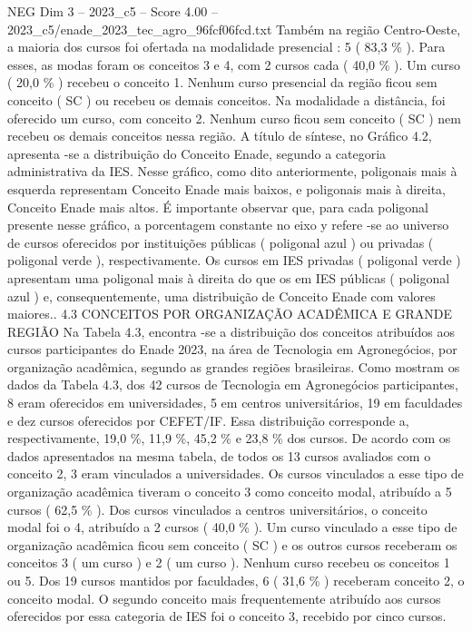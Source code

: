 \begin{textsample}{NEG Dim 3 – 2023\_c5 – Score 4.00 – 2023\_c5/enade\_2023\_tec\_agro\_96fcf06fcd.txt}
Também na região Centro-Oeste, a maioria dos cursos foi ofertada na modalidade presencial : 5 ( 83,3 \% ).
Para esses, as modas foram os conceitos 3 e 4, com 2 cursos cada ( 40,0 \% ).
Um curso ( 20,0 \% ) recebeu o conceito 1.
Nenhum curso presencial da região ficou sem conceito ( SC ) ou recebeu os demais conceitos.
Na modalidade a distância, foi oferecido um curso, com conceito 2.
Nenhum curso ficou sem conceito ( SC ) nem recebeu os demais conceitos nessa região.
A título de síntese, no Gráfico 4.2, apresenta -se a distribuição do Conceito Enade, segundo a categoria administrativa da IES.
Nesse gráfico, como dito anteriormente, poligonais mais à esquerda representam Conceito Enade mais baixos, e poligonais mais à direita, Conceito Enade mais altos.
É importante observar que, para cada poligonal presente nesse gráfico, a porcentagem constante no eixo y refere -se ao universo de cursos oferecidos por instituições públicas ( poligonal azul ) ou privadas ( poligonal verde ), respectivamente.
Os cursos em IES privadas ( poligonal verde ) apresentam uma poligonal mais à direita do que os em IES públicas ( poligonal azul ) e, consequentemente, uma distribuição de Conceito Enade com valores maiores.. 4.3 CONCEITOS POR ORGANIZAÇÃO ACADÊMICA E GRANDE REGIÃO Na Tabela 4.3, encontra -se a distribuição dos conceitos atribuídos aos cursos participantes do Enade 2023, na área de Tecnologia em Agronegócios, por organização acadêmica, segundo as grandes regiões brasileiras.
Como mostram os dados da Tabela 4.3, dos 42 cursos de Tecnologia em Agronegócios participantes, 8 eram oferecidos em universidades, 5 em centros universitários, 19 em faculdades e dez cursos oferecidos por CEFET/IF.
Essa distribuição corresponde a, respectivamente, 19,0 \%, 11,9 \%, 45,2 \% e 23,8 \% dos cursos.
De acordo com os dados apresentados na mesma tabela, de todos os 13 cursos avaliados com o conceito 2, 3 eram vinculados a universidades.
Os cursos vinculados a esse tipo de organização acadêmica tiveram o conceito 3 como conceito modal, atribuído a 5 cursos ( 62,5 \% ).
Dos cursos vinculados a centros universitários, o conceito modal foi o 4, atribuído a 2 cursos ( 40,0 \% ).
Um curso vinculado a esse tipo de organização acadêmica ficou sem conceito ( SC ) e os outros cursos receberam os conceitos 3 ( um curso ) e 2 ( um curso ).
Nenhum curso recebeu os conceitos 1 ou 5.
Dos 19 cursos mantidos por faculdades, 6 ( 31,6 \% ) receberam conceito 2, o conceito modal.
O segundo conceito mais frequentemente atribuído aos cursos oferecidos por essa categoria de IES foi o conceito 3, recebido por cinco cursos.

\end{textsample}
